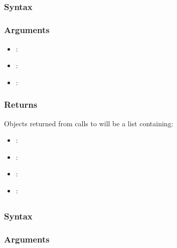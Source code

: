 \documentclass[]{jss}
\begin{document}
\subsection[lmtp_contrast]{}

\subsubsection{Syntax}

\subsubsection{Arguments}

\begin{itemize}

  \item {}: 
  \item {}: 
  \item {}: 
  
\end{itemize}

\subsubsection{Returns}

Objects returned from calls to  will be a list containing:

\begin{itemize}

  \item {}: 
  \item {}: 
  \item {}: 
  \item {}: 
  
\end{itemize}

\subsection[create_node_list]{}

\subsubsection{Syntax}

\subsubsection{Arguments}
\end{document}
